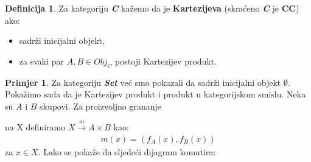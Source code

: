 \documentclass[11pt]{article}
\newcommand{\category}[1]{\textbf{\emph{#1}}}
\theoremstyle{definition}
\newtheorem{definition}{Definicija}
\newtheorem{primjer}{Primjer}
\begin{document}
  \begin{definition}
    Za kategoriju \category{C} kažemo da je \textbf{Kartezijeva} (skraćeno
    \category{C} je \textbf{CC}) ako:
    \begin{itemize}
      \item sadrži inicijalni objekt,
      \item za svaki par $A, B \in Obj_C$ postoji Kartezijev produkt.
    \end{itemize}
  \end{definition}
  \begin{primjer}
    Za kategoriju \category{Set} već smo pokazali da sadrži inicijalni objekt
    $\emptyset$.
    Pokažimo sada da je Kartezijev produkt i produkt u kategorijskom smislu.
    Neka su $A$ i $B$ skupovi.
    Za proizvoljno grananje
    \begin{center}
    \end{center}
    na X definiramo $X \xrightarrow{m} A \times B$ kao:
    \begin{align*}
      m(x) = (f_A(x), f_B(x))
    \end{align*}
    za $x \in X$. Lako se pokaže da sljedeći dijagram komutira:
  \begin{center}
  \end{center}

\end{primjer}
\end{document}
